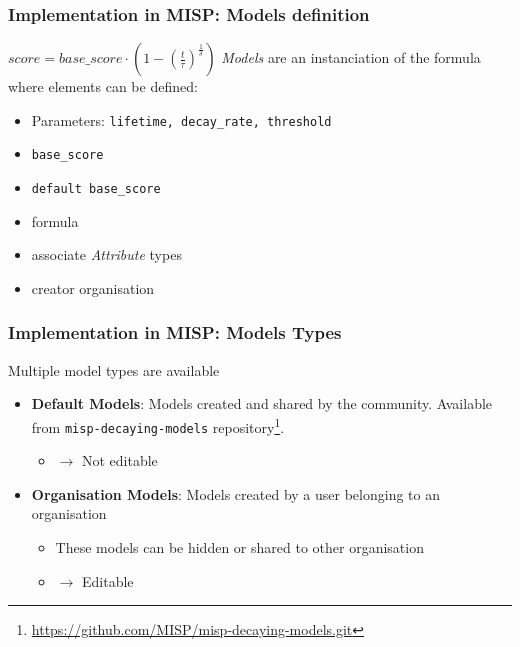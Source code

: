 \begin{frame}
    \frametitle{Implementation in MISP: Models definition}
        \hspace{190pt}
        \raisebox{-1.0ex}{\Large $\Rsh$} {\tiny $score = base\_score \cdot \left( 1 - \left( \frac{t}{\tau} \right)^{\frac{1}{\delta}} \right) $}
    \textit{Models} are an instanciation of the formula where elements can be defined:
    \begin{itemize}
        \item Parameters: \texttt{lifetime, decay\_rate, threshold}
        \item \texttt{base\_score}
        \item \texttt{default base\_score}
        \item formula
        \item associate \textit{Attribute} types
        \item creator organisation
    \end{itemize}
\end{frame}

\begin{frame}
    \frametitle{Implementation in MISP: Models Types}
    Multiple model types are available
    \begin{itemize}
        \item \textbf{Default Models}: Models created and shared by the community. Available from \texttt{misp-decaying-models} repository\footnote{\url{https://github.com/MISP/misp-decaying-models.git}}.
        \begin{itemize}
            \item $\rightarrow$ Not editable
        \end{itemize}
    \item \textbf{Organisation Models}: Models created by a user belonging to an organisation
        \begin{itemize}
            \item These models can be hidden or shared to other organisation 
            \item $\rightarrow$ Editable
        \end{itemize}
    \end{itemize}
\end{frame}

